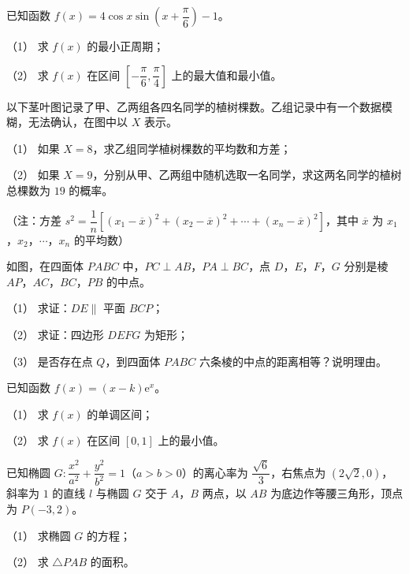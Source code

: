 \begin{question}
已知函数 $f(x)=4\cos x\sin\left(x+\dfrac{\pi}{6}\right)-1$。

（1） 求 $f(x)$ 的最小正周期；

（2） 求 $f(x)$ 在区间 $\left[-\dfrac{\pi}{6},\dfrac{\pi}{4}\right]$ 上的最大值和最小值。

\Needspace{0.4\textheight}
\end{question}
\begin{question}
以下茎叶图记录了甲、乙两组各四名同学的植树棵数。乙组记录中有一个数据模糊，无法确认，在图中以 $X$ 表示。
\nopagebreak[4]
\begin{center}\end{center}
\nopagebreak[4]
（1） 如果 $X=8$，求乙组同学植树棵数的平均数和方差；

（2） 如果 $X=9$，分别从甲、乙两组中随机选取一名同学，求这两名同学的植树总棵数为 $19$ 的概率。

（注：方差 $s^2=\dfrac1n\left[(x_1-\overline x)^2+(x_2-\overline x)^2+\cdots+(x_n-\overline x)^2\right]$，其中 $\overline x$ 为 $x_1$，$x_2$，$\cdots$，$x_n$ 的平均数）

\Needspace{0.4\textheight}
\end{question}
\begin{question}
如图，在四面体 $PABC$ 中，$PC\perp AB$，$PA\perp BC$，点 $D$，$E$，$F$，$G$ 分别是棱 $AP$，$AC$，$BC$，$PB$ 的中点。

（1） 求证：$DE\parallel$ 平面 $BCP$；

（2） 求证：四边形 $DEFG$ 为矩形；

（3） 是否存在点 $Q$，到四面体 $PABC$ 六条棱的中点的距离相等？说明理由。
\nopagebreak[4]
\begin{center}\end{center}
\nopagebreak[4]
\end{question}
\begin{question}
已知函数 $f(x)=(x-k)\mathrm{e}^x$。

（1） 求 $f(x)$ 的单调区间；

（2） 求 $f(x)$ 在区间 $[0,1]$ 上的最小值。

\end{question}
\begin{question}
已知椭圆 $G:\dfrac{x^2}{a^2}+\dfrac{y^2}{b^2}=1$（$a>b>0$）的离心率为 $\dfrac{\sqrt6}{3}$，右焦点为 $(2\sqrt2,0)$，斜率为 $1$ 的直线 $l$ 与椭圆 $G$ 交于 $A$，$B$ 两点，以 $AB$ 为底边作等腰三角形，顶点为 $P(-3,2)$。

（1） 求椭圆 $G$ 的方程；

（2） 求 $\triangle PAB$ 的面积。

\end{question}
